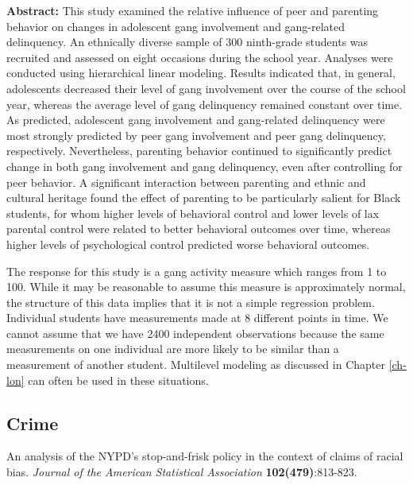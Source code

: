\documentclass[
]{krantz}
\renewenvironment{quote}{\begin{VF}}{\end{VF}}
\begin{document}
\begin{quote}
\textbf{Abstract:} This study examined the relative influence of peer and parenting behavior on changes in adolescent gang involvement and gang-related delinquency. An ethnically diverse sample of 300 ninth-grade students was recruited and assessed on eight occasions during the school year. Analyses were conducted using hierarchical linear modeling. Results indicated that, in general, adolescents decreased their level of gang involvement over the course of the school year, whereas the average level of gang delinquency remained constant over time. As predicted, adolescent gang involvement and gang-related delinquency were most strongly predicted by peer gang involvement and peer gang delinquency, respectively. Nevertheless, parenting behavior continued to significantly predict change in both gang involvement and gang delinquency, even after controlling for peer behavior. A significant interaction between parenting and ethnic and cultural heritage found the effect of parenting to be particularly salient for Black students, for whom higher levels of behavioral control and lower levels of lax parental control were related to better behavioral outcomes over time, whereas higher levels of psychological control predicted worse behavioral outcomes.
\end{quote}

The response for this study is a gang activity measure which ranges from 1 to 100. While it may be reasonable to assume this measure is approximately normal, the structure of this data implies that it is not a simple regression problem. Individual students have measurements made at 8 different points in time. We cannot assume that we have 2400 independent observations because the same measurements on one individual are more likely to be similar than a measurement of another student. Multilevel modeling as discussed in Chapter \ref{ch-lon} can often be used in these situations.

\hypertarget{crime}{%
\subsection{Crime}\label{crime}}

\citet{Gelman2007} An analysis of the NYPD's stop-and-frisk policy in the context of claims of racial bias. \emph{Journal of the American Statistical Association} \textbf{102(479)}:813-823.
\end{document}
